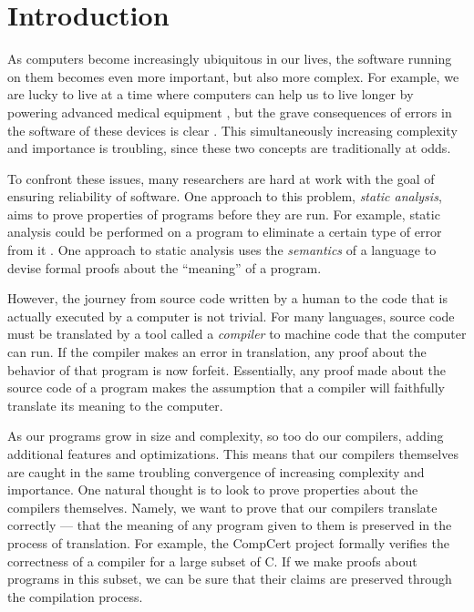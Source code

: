 \chapter{Introduction}
As computers become increasingly ubiquitous in our lives, the software running on them becomes even more important, but also more complex. For example, we are lucky to live at a time where computers can help us to live longer by powering advanced medical equipment \cite{med_software}, but the grave consequences of errors in the software of these devices is clear \cite{sandler2010killed}. This simultaneously increasing complexity and importance is troubling, since these two concepts are traditionally at odds. 

To confront these issues, many researchers are hard at work with the goal of ensuring reliability of software. One approach to this problem, \textit{static analysis}, aims to prove properties of programs before they are run. For example, static analysis could be performed on a program to eliminate a certain type of error from it \cite{ayewah2008using}. One approach to static analysis uses the \textit{semantics} \cite{schmidt1996programming} of a language to devise formal proofs about the ``meaning'' of a program.

However, the journey from source code written by a human to the code that is actually executed by a computer is not trivial. For many languages, source code must be translated by a tool called a \textit{compiler} to machine code that the computer can run. If the compiler makes an error in translation, any proof about the behavior of that program is now forfeit. Essentially, any proof made about the source code of a program makes the assumption that a compiler will faithfully translate its meaning to the computer.

As our programs grow in size and complexity, so too do our compilers, adding additional features and optimizations. This means that our compilers themselves are caught in the same troubling convergence of increasing complexity and importance. One natural thought is to look to prove properties about the compilers themselves. Namely, we want to prove that our compilers translate correctly --- that the meaning of any program given to them is preserved in the process of translation. For example, the CompCert project \cite{leroy2019compcert} formally verifies the correctness of a compiler for a large subset of C. If we make proofs about programs in this subset, we can be sure that their claims are preserved through the compilation process. 

